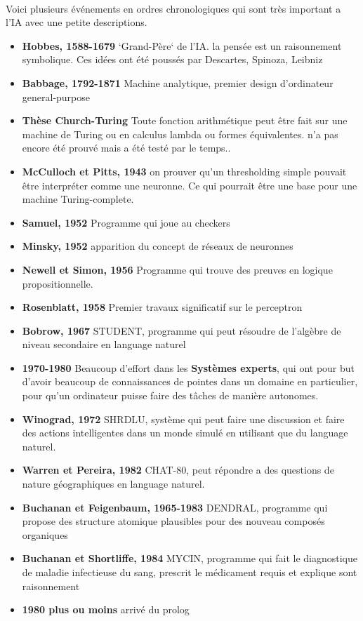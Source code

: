 \documentclass{book}
\begin{document}
\paragraph{}
Voici plusieurs événements en ordres chronologiques qui sont très important a l'IA avec une petite descriptions.
\begin{itemize}


\item \textbf{Hobbes, 1588-1679}
`Grand-Père` de l'IA. la pensée est un raisonnement symbolique. Ces idées ont été poussés par Descartes, Spinoza, Leibniz

\item \textbf{Babbage, 1792-1871}
Machine analytique, premier design d'ordinateur general-purpose

\item \textbf{Thèse Church-Turing}
Toute fonction arithmétique peut être fait sur une machine de Turing ou en calculus lambda ou formes équivalentes. n'a pas encore été prouvé mais a été testé par le temps..
\item \textbf{McCulloch et Pitts, 1943}
on prouver qu'un thresholding simple pouvait être interpréter comme une neuronne. Ce qui pourrait être une base pour une machine Turing-complete.
\item \textbf{Samuel, 1952}
Programme qui joue au checkers
\item \textbf{Minsky, 1952}
apparition du concept de réseaux de neuronnes
\item \textbf{Newell et Simon, 1956}
Programme qui trouve des preuves en logique propositionnelle.

\item \textbf{Rosenblatt, 1958}
Premier travaux significatif sur le perceptron
\item \textbf{Bobrow, 1967}
STUDENT, programme qui peut résoudre de l'algèbre de niveau secondaire en language naturel

\item \textbf{1970-1980}
Beaucoup d'effort dans les \textbf{Systèmes experts}, qui ont pour but d'avoir beaucoup de connaissances de pointes dans un domaine en particulier, pour qu'un ordinateur puisse faire des tâches de manière autonomes.
\item \textbf{Winograd, 1972}
SHRDLU, système qui peut faire une discussion et faire des actions intelligentes dans un monde simulé en utilisant que du language naturel.
\item \textbf{Warren et Pereira, 1982}
CHAT-80, peut répondre a des questions de nature géographiques en language naturel.
\item \textbf{Buchanan et Feigenbaum, 1965-1983}
DENDRAL, programme qui propose des structure atomique plausibles pour des nouveau composés organiques
\item \textbf{Buchanan et Shortliffe, 1984}
MYCIN, programme qui fait le diagnostique de maladie infectieuse du sang, prescrit le médicament requis et explique sont raisonnement
\item \textbf{1980 plus ou moins}
arrivé du prolog
\end{itemize}
\end{document}
